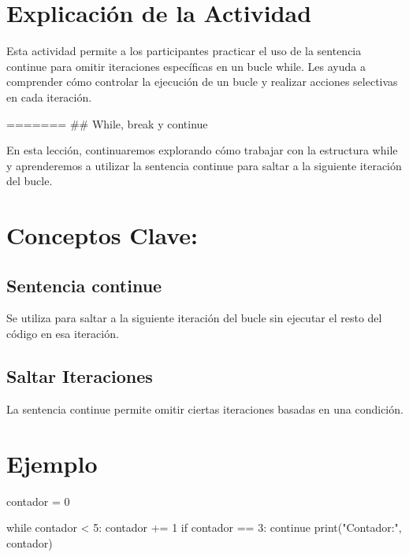 \documentclass[
  a4paper,
  onepage,
  openany]{scrreprt}
\newenvironment{Shaded}{\begin{snugshade}}{\end{snugshade}}
\newcommand{\BuiltInTok}[1]{\textcolor[rgb]{0.00,0.23,0.31}{#1}}
\newcommand{\ControlFlowTok}[1]{\textcolor[rgb]{0.00,0.23,0.31}{#1}}
\newcommand{\DecValTok}[1]{\textcolor[rgb]{0.68,0.00,0.00}{#1}}
\newcommand{\NormalTok}[1]{\textcolor[rgb]{0.00,0.23,0.31}{#1}}
\newcommand{\OperatorTok}[1]{\textcolor[rgb]{0.37,0.37,0.37}{#1}}
\newcommand{\StringTok}[1]{\textcolor[rgb]{0.13,0.47,0.30}{#1}}
\begin{document}
\hypertarget{explicaciuxf3n-de-la-actividad-38}{%
\section{Explicación de la
Actividad}\label{explicaciuxf3n-de-la-actividad-38}}

Esta actividad permite a los participantes practicar el uso de la
sentencia continue para omitir iteraciones específicas en un bucle
while. Les ayuda a comprender cómo controlar la ejecución de un bucle y
realizar acciones selectivas en cada iteración.

======= \#\# While, break y continue

En esta lección, continuaremos explorando cómo trabajar con la
estructura while y aprenderemos a utilizar la sentencia continue para
saltar a la siguiente iteración del bucle.

\hypertarget{conceptos-clave-41}{%
\section{Conceptos Clave:}\label{conceptos-clave-41}}

\hypertarget{sentencia-continue-1}{%
\subsection{Sentencia continue}\label{sentencia-continue-1}}

Se utiliza para saltar a la siguiente iteración del bucle sin ejecutar
el resto del código en esa iteración.

\hypertarget{saltar-iteraciones-1}{%
\subsection{Saltar Iteraciones}\label{saltar-iteraciones-1}}

La sentencia continue permite omitir ciertas iteraciones basadas en una
condición.

\hypertarget{ejemplo-41}{%
\section{Ejemplo}\label{ejemplo-41}}

\begin{Shaded}
\begin{Highlighting}[]
\NormalTok{contador }\OperatorTok{=} \DecValTok{0}

\ControlFlowTok{while}\NormalTok{ contador }\OperatorTok{\textless{}} \DecValTok{5}\NormalTok{:}
\NormalTok{    contador }\OperatorTok{+=} \DecValTok{1}
    \ControlFlowTok{if}\NormalTok{ contador }\OperatorTok{==} \DecValTok{3}\NormalTok{:}
        \ControlFlowTok{continue}
    \BuiltInTok{print}\NormalTok{(}\StringTok{"Contador:"}\NormalTok{, contador)}
\end{Highlighting}
\end{Shaded}
\end{document}
